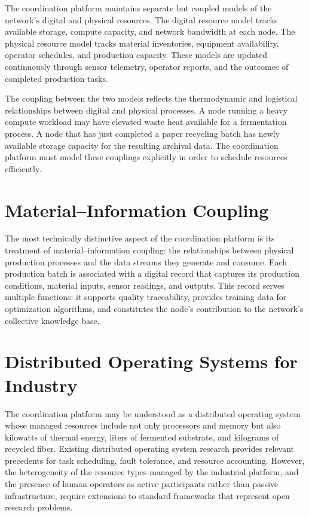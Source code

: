 \documentclass[12pt]{book}
\theoremstyle{definition}
\theoremstyle{remark}
\begin{document}
The coordination platform maintains separate but coupled models of
the network's digital and physical resources. The digital resource
model tracks available storage, compute capacity, and network
bandwidth at each node. The physical resource model tracks material
inventories, equipment availability, operator schedules, and
production capacity. These models are updated continuously through
sensor telemetry, operator reports, and the outcomes of completed
production tasks.

The coupling between the two models reflects the thermodynamic and
logistical relationships between digital and physical processes. A
node running a heavy compute workload may have elevated waste heat
available for a fermentation process. A node that has just completed
a paper recycling batch has newly available storage capacity for the
resulting archival data. The coordination platform must model these
couplings explicitly in order to schedule resources efficiently.

\section{Material--Information Coupling}

The most technically distinctive aspect of the coordination platform
is its treatment of material--information coupling: the relationships
between physical production processes and the data streams they
generate and consume. Each production batch is associated with a
digital record that captures its production conditions, material
inputs, sensor readings, and outputs. This record serves multiple
functions: it supports quality traceability, provides training data
for optimization algorithms, and constitutes the node's contribution
to the network's collective knowledge base.

\section{Distributed Operating Systems for Industry}

The coordination platform may be understood as a distributed
operating system whose managed resources include not only processors
and memory but also kilowatts of thermal energy, liters of fermented
substrate, and kilograms of recycled fiber. Existing distributed
operating system research provides relevant precedents for task
scheduling, fault tolerance, and resource accounting. However, the
heterogeneity of the resource types managed by the industrial
platform, and the presence of human operators as active participants
rather than passive infrastructure, require extensions to standard
frameworks that represent open research problems.
\end{document}
